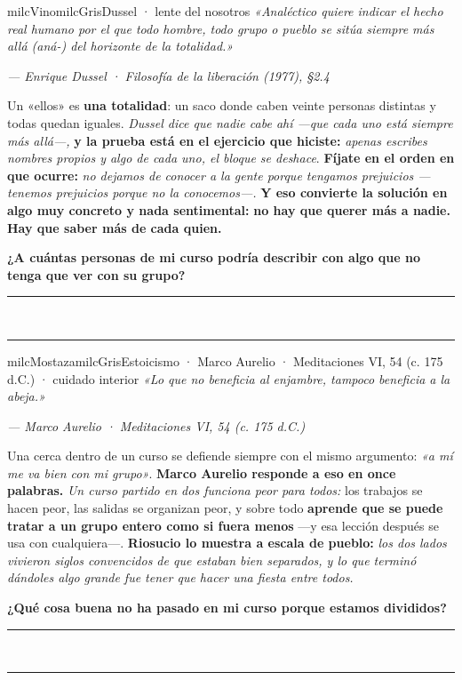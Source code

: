 \documentclass[11pt,letterpaper]{article}
\newcommand{\linead}[1]{\noindent\color{milcLinea}\rule{#1}{0.5pt}\color{milcNegro}}
\begin{document}
\begin{softbox}{milcVino}{milcGris}{Dussel · lente del nosotros}
\textit{«Analéctico quiere indicar el hecho real humano por el que todo hombre, todo grupo o pueblo se sitúa siempre más allá (aná-) del horizonte de la totalidad.»}

{\footnotesize\itshape\color{milcNegro!70}--- Enrique Dussel · Filosofía de la liberación (1977), §2.4}

Un «ellos» es \textbf{una totalidad}: un saco donde caben veinte personas distintas y todas quedan iguales. \emph{Dussel dice que nadie cabe ahí ---que cada uno está siempre más allá---,} \textbf{y la prueba está en el ejercicio que hiciste:} \emph{apenas escribes nombres propios y algo de cada uno, el bloque se deshace}. \textbf{Fíjate en el orden en que ocurre:} \emph{no dejamos de conocer a la gente porque tengamos prejuicios ---tenemos prejuicios porque no la conocemos---.} \textbf{Y eso convierte la solución en algo muy concreto y nada sentimental:} \textbf{no hay que querer más a nadie. Hay que saber más de cada quien.}

\textbf{¿A cuántas personas de mi curso podría describir con algo que no tenga que ver con su grupo?}
\end{softbox}
\linead{\linewidth}\\[1mm]
\linead{\linewidth}

\begin{softbox}{milcMostaza}{milcGris}{Estoicismo · Marco Aurelio · Meditaciones VI, 54 (c. 175 d.C.) · cuidado interior}
\textit{«Lo que no beneficia al enjambre, tampoco beneficia a la abeja.»}

{\footnotesize\itshape\color{milcNegro!70}--- Marco Aurelio · Meditaciones VI, 54 (c. 175 d.C.)}

Una cerca dentro de un curso se defiende siempre con el mismo argumento: \emph{«a mí me va bien con mi grupo»}. \textbf{Marco Aurelio responde a eso en once palabras.} \emph{Un curso partido en dos funciona peor para todos:} los trabajos se hacen peor, las salidas se organizan peor, y sobre todo \textbf{aprende que se puede tratar a un grupo entero como si fuera menos} ---y esa lección después se usa con cualquiera---. \textbf{Riosucio lo muestra a escala de pueblo:} \emph{los dos lados vivieron siglos convencidos de que estaban bien separados, y lo que terminó dándoles algo grande fue tener que hacer una fiesta entre todos.}

\textbf{¿Qué cosa buena no ha pasado en mi curso porque estamos divididos?}
\end{softbox}
\linead{\linewidth}\\[1mm]
\linead{\linewidth}
\end{document}
